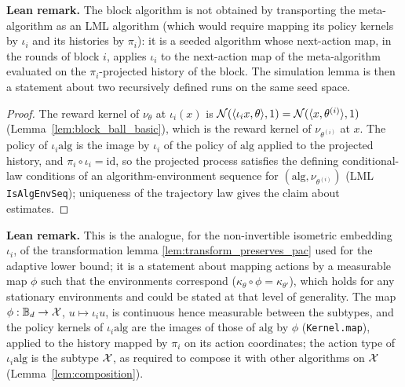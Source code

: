 \textbf{Lean remark.} The block algorithm is not obtained by transporting the meta-algorithm
as an LML algorithm (which would require mapping its policy kernels by $\iota_i$ and its
histories by $\pi_i$): it is a seeded algorithm whose next-action map, in the rounds of block
$i$, applies $\iota_i$ to the next-action map of the meta-algorithm evaluated on the
$\pi_i$-projected history of the block. The simulation lemma is then a statement about two
recursively defined runs on the same seed space.

\begin{proof}
The reward kernel of $\nu_\theta$ at $\iota_i(x)$ is
$\mathcal{N}(\langle \iota_ix, \theta \rangle, 1) = \mathcal{N}(\langle x, \theta^{(i)} \rangle, 1)$
(Lemma~\ref{lem:block_ball_basic}), which is the reward kernel of $\nu_{\theta^{(i)}}$ at $x$.
The policy of $\iota_i\mathrm{alg}$ is the image by $\iota_i$ of the policy of $\mathrm{alg}$
applied to the projected history, and $\pi_i\circ\iota_i = \mathrm{id}$, so the projected
process satisfies the defining conditional-law conditions of an algorithm-environment
sequence for $(\mathrm{alg},\nu_{\theta^{(i)}})$ (LML \texttt{IsAlgEnvSeq}); uniqueness of the
trajectory law gives the claim about estimates.
\end{proof}

\textbf{Lean remark.} This is the analogue, for the non-invertible isometric embedding
$\iota_i$, of the transformation lemma \ref{lem:transform_preserves_pac} used for the
adaptive lower bound; it is a statement about mapping actions by a measurable map $\phi$
such that the environments correspond ($\kappa_\theta \circ \phi = \kappa_{\theta'}$), which
holds for any stationary environments and could be stated at that level of generality. The
map $\phi : \mathbb{B}_d \to \mathcal{X}$, $u \mapsto \iota_i u$, is continuous hence measurable between
the subtypes, and the policy kernels of $\iota_i\mathrm{alg}$ are the images of those of
$\mathrm{alg}$ by $\phi$ (\texttt{Kernel.map}), applied to the history mapped by $\pi_i$ on
its action coordinates; the action type of $\iota_i\mathrm{alg}$ is the subtype $\mathcal{X}$, as
required to compose it with other algorithms on $\mathcal{X}$ (Lemma~\ref{lem:composition}).

